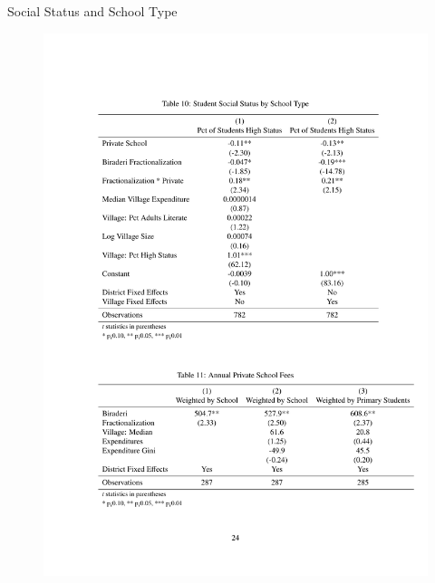 \documentclass[handout]{beamer}
\begin{document}
\begin{frame}{Social Status and School Type}
	\begin{figure}[htb]
		\begin{center}
		\includegraphics[scale=0.5]{tables/social_status_type.pdf}
		\end{center}
	\end{figure}
\end{frame}
\end{document}
